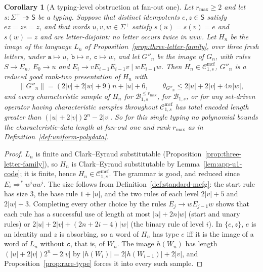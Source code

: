 \documentclass[11pt]{article}
\numberwithin{equation}{section}
\theoremstyle{plain}
\newtheorem{corollary}[theorem]{Corollary}
\theoremstyle{definition}
\theoremstyle{remark}
\newcommand{\Cmcf}[2]{\mathcal{C}^{\mathrm{mcf}}_{#1,#2}}
\theoremstyle{plain}
\begin{document}
\begin{corollary}[A typing-level obstruction at fan-out one]
\label{cor:typing-level-obstruction}
Let $r_{\max}\ge2$ and let $s:\Sigma^+\twoheadrightarrow\mathsf S$ be a typing.
Suppose that distinct idempotents $e,z\in\mathsf S$ satisfy $ez=ze=z$, and that
words $u,v,w\in\Sigma^+$ satisfy $s(u)=s(v)=e$ and $s(w)=z$ and are
\emph{letter-disjoint}: no letter occurs twice in $uvw$.  Let $H_n$ be the image
of the language $L_n$ of Proposition~\ref{prop:three-letter-family}, over three
fresh letters, under $\mathtt a\mapsto u$, $\mathtt b\mapsto v$, $\mathtt c\mapsto w$,
and let $G''_n$ be the image of $G_n$, with rules $S\to E_n$, $E_0\to u$ and
$E_i\to vE_{i-1}E_{i-1}v\mid wE_{i-1}w$.  Then $H_n\in\Cmcf{1}{s}$, $G''_n$ is a
reduced good rank-two presentation of $H_n$ with
\[
 \|G''_n\|=(2|v|+2|w|+9)n+|u|+6,\qquad
 \bar\theta_{G''_n}\le2|u|+2|v|+4n|w|,
\]
and every characteristic sample of $H_n$ for $\mathcal B^{\le r_{\max}}_{1,s}$,
for $\mathcal B_{1,s}$, or for any set-driven operator having characteristic
samples throughout $\Cmcf{1}{s}$ has total encoded length greater than
$(|u|+2|v|)2^n-2|v|$.  So for this single typing no polynomial bounds the
characteristic-data length at fan-out one and rank $r_{\max}$ as in
Definition~\ref{def:uniform-polydata}.
\end{corollary}

\begin{proof}
$L_n$ is finite and Clark--Eyraud substitutable
(Proposition~\ref{prop:three-letter-family}), so $H_n$ is Clark--Eyraud
substitutable by Lemma~\ref{lem:app-u1-code}; it is finite, hence
$H_n\in\Cmcf{1}{s}$.  The grammar is good, and reduced since
$E_i\Rightarrow^*w^iuw^i$.  The size follows from
Definition~\ref{def:standard-mcfg}: the start rule has size $3$, the base rule
$1+|u|$, and the two rules of each level $2|v|+5$ and $2|w|+3$.  Completing every
other choice by the rules $E_j\to wE_{j-1}w$ shows that each rule has a
successful use of length at most $|u|+2n|w|$ (start and unary rules) or
$2|u|+2|v|+(2n+2i-4)|w|$ (the binary rule of level $i$).  In $\{e,z\}$, $e$ is an
identity and $z$ is absorbing, so a word of $H_n$ has type $e$ iff it is the
image of a word of $L_n$ without $\mathtt c$, that is, of $W_n$.  The image $h(W_n)$ has length
$(|u|+2|v|)2^n-2|v|$ by $|h(W_i)|=2|h(W_{i-1})|+2|v|$, and
Proposition~\ref{prop:rare-type} forces it into every such sample.
\end{proof}
\end{document}
